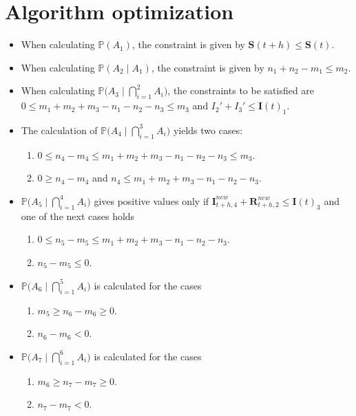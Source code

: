 \documentclass[a4paper]{article}
\renewcommand{\vec}[1]{\boldsymbol{#1}}
\theoremstyle{remark}
\begin{document}
\section{Algorithm optimization}
    \begin{itemize}
        \item When calculating $\mathbb{P}(A_{1})$, the constraint is given by $\vec{S}(t+h)\leq\vec{S}(t)$.
        \item When calculating $\mathbb{P}(A_{2}\mid A_{1})$, the constraint is given by $n_1+n_2-m_1\leq m_2$.
        \item When calculating $\mathbb{P}\big(A_{3}\mid \bigcap_{i=1}^{2}A_{i}\big)$, the constraints to be satisfied are $0\leq m_1+m_2+m_3-n_1-n_2-n_3\leq m_3$ and $I_{2}'+I_{3}'\leq \vec{I}(t)_{1}$.
        \item The calculation of $\mathbb{P}\big(A_{4}\mid \bigcap_{i=1}^{3}A_{i}\big)$ yields two cases:
        \begin{enumerate}
            \item $0\leq n_4-m_4 \leq m_1+m_2+m_3-n_1-n_2-n_3\leq m_3$.
            \item $0\geq n_4-m_4$ and $n_4\leq m_1+m_2+m_3-n_1-n_2-n_3$.
        \end{enumerate}
        \item $\mathbb{P}\big(A_{5}\mid \bigcap_{i=1}^{4}A_{i}\big)$ gives positive values only if $\vec{I}^{new}_{t+h,4}+\vec{R}^{new}_{t+h,2}\leq \vec{I}(t)_{3}$ and one of the next cases holds
        \begin{enumerate}
            \item $0\leq n_5-m_5 \leq m_1+m_2+m_3-n_1-n_2-n_3$.
            \item $n_5-m_5\leq 0$.
        \end{enumerate}
        \item $\mathbb{P}\big(A_{6}\mid \bigcap_{i=1}^{5}A_{i}\big)$ is calculated for the cases
        \begin{enumerate}
            \item $m_5\geq n_6-m_6\geq 0$.
            \item $n_6-m_6< 0$.
        \end{enumerate}
        \item $\mathbb{P}\big(A_{7}\mid \bigcap_{i=1}^{6}A_{i}\big)$ is calculated for the cases
        \begin{enumerate}
            \item $m_6\geq n_7-m_7\geq 0$.
            \item $n_7-m_7< 0$.

\end{enumerate}
\end{itemize}
\end{document}
